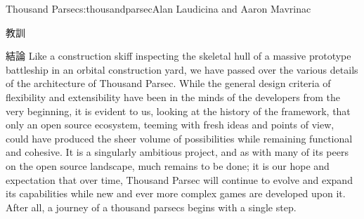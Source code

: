 \begin{aosachapter}{Thousand Parsec}{s:thousandparsec}{Alan Laudicina and Aaron Mavrinac}
\begin{aosasect1}{教訓}
\begin{aosasect2}{結論}
Like a construction skiff inspecting the skeletal hull of a massive
prototype battleship in an orbital construction yard, we have passed
over the various details of the architecture of Thousand Parsec. While
the general design criteria of flexibility and extensibility have been
in the minds of the developers from the very beginning, it is evident
to us, looking at the history of the framework, that only an open
source ecosystem, teeming with fresh ideas and points of view, could
have produced the sheer volume of possibilities while remaining
functional and cohesive. It is a singularly ambitious project, and as
with many of its peers on the open source landscape, much remains to
be done; it is our hope and expectation that over time, Thousand
Parsec will continue to evolve and expand its capabilities while new
and ever more complex games are developed upon it. After all, a
journey of a thousand parsecs begins with a single step.

\end{aosasect2}

\end{aosasect1}

\end{aosachapter}

